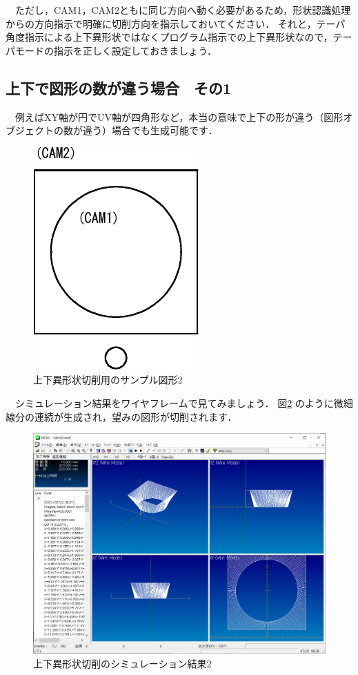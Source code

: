 　ただし，CAM1，CAM2ともに同じ方向へ動く必要があるため，形状認識処理からの方向指示で明確に切削方向を指示しておいてください．
それと，テーパ角度指示による上下異形状ではなくプログラム指示での上下異形状なので，テーパモードの指示を正しく設定しておきましょう．

\subsection{上下で図形の数が違う場合　その1}
　例えばXY軸が円でUV軸が四角形など，本当の意味で上下の形が違う（図形オブジェクトの数が違う）場合でも生成可能です．

\begin{figure}[H]
\centering
\includegraphics{No2/fig/sample3-crop.pdf}
\caption{上下異形状切削用のサンプル図形2}
\label{fig:sample3.pdf}
\end{figure}

　シミュレーション結果をワイヤフレームで見てみましょう．
図\ref{fig:simu3.png} のように微細線分の連続が生成され，望みの図形が切削されます．

\begin{figure}[H]
\centering
\includegraphics[scale=0.5]{No2/fig/simu3.png}
\caption{上下異形状切削のシミュレーション結果2}
\label{fig:simu3.png}
\end{figure}

